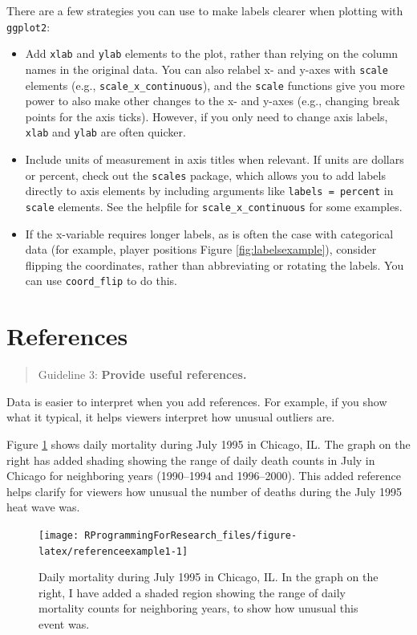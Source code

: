 \documentclass[]{book}
\providecommand{\tightlist}{%
  \setlength{\itemsep}{0pt}\setlength{\parskip}{0pt}}
\begin{document}
There are a few strategies you can use to make labels clearer when
plotting with \texttt{ggplot2}:

\begin{itemize}
\tightlist
\item
  Add \texttt{xlab} and \texttt{ylab} elements to the plot, rather than
  relying on the column names in the original data. You can also relabel
  x- and y-axes with \texttt{scale} elements (e.g.,
  \texttt{scale\_x\_continuous}), and the \texttt{scale} functions give
  you more power to also make other changes to the x- and y-axes (e.g.,
  changing break points for the axis ticks). However, if you only need
  to change axis labels, \texttt{xlab} and \texttt{ylab} are often
  quicker.
\item
  Include units of measurement in axis titles when relevant. If units
  are dollars or percent, check out the \texttt{scales} package, which
  allows you to add labels directly to axis elements by including
  arguments like \texttt{labels\ =\ percent} in \texttt{scale} elements.
  See the helpfile for \texttt{scale\_x\_continuous} for some examples.
\item
  If the x-variable requires longer labels, as is often the case with
  categorical data (for example, player positions Figure
  \ref{fig:labelsexample}), consider flipping the coordinates, rather
  than abbreviating or rotating the labels. You can use
  \texttt{coord\_flip} to do this.
\end{itemize}

\section{References}\label{references}

\begin{quote}
Guideline 3: \textbf{Provide useful references.}
\end{quote}

Data is easier to interpret when you add references. For example, if you
show what it typical, it helps viewers interpret how unusual outliers
are.

Figure \ref{fig:referenceexample1} shows daily mortality during July
1995 in Chicago, IL. The graph on the right has added shading showing
the range of daily death counts in July in Chicago for neighboring years
(1990--1994 and 1996--2000). This added reference helps clarify for
viewers how unusual the number of deaths during the July 1995 heat wave
was.

\begin{figure}

{\centering \texttt{[image: RProgrammingForResearch\_files/figure-latex/referenceexample1-1]} 

}

\caption{Daily mortality during July 1995 in Chicago, IL. In the graph on the right, I have added a shaded region showing the range of daily mortality counts for neighboring years, to show how unusual this event was.}\label{fig:referenceexample1}
\end{figure}
\end{document}
